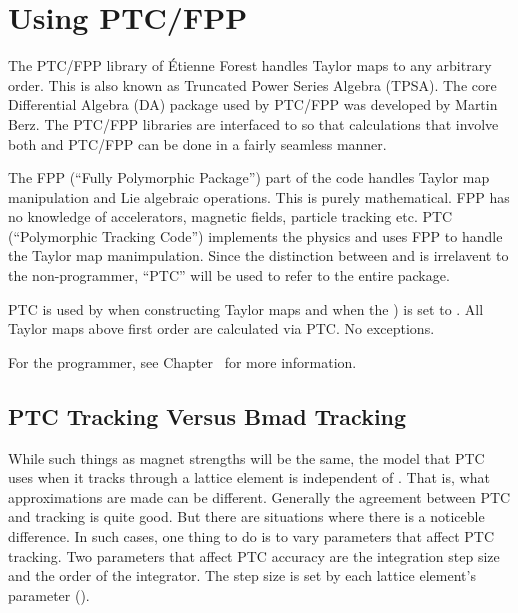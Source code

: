 \chapter{Using PTC/FPP}
\label{c:ptc.use}


The PTC/FPP library of \'Etienne Forest handles Taylor maps to any arbitrary order. This is also
known as Truncated Power Series Algebra (TPSA). The core Differential Algebra (DA) package used by
PTC/FPP was developed by Martin Berz\cite{b:berz}. The PTC/FPP libraries are interfaced to \bmad so
that calculations that involve both \bmad and PTC/FPP can be done in a fairly seamless manner.

The FPP (``Fully Polymorphic Package'') part of the code handles Taylor map manipulation
and Lie algebraic operations. This is purely mathematical. FPP has no knowledge of accelerators,
magnetic fields, particle tracking etc. PTC (``Polymorphic Tracking Code'') implements the physics
and uses FPP to handle the Taylor map manimpulation. Since the distinction between  and
 is irrelavent to the non-programmer, ``PTC'' will be used to refer to the entire package.

PTC is used by \bmad when constructing Taylor maps and when the 
) is set to . All Taylor maps above first order are calculated
via PTC. No exceptions.

For the programmer, see Chapter~ for more information.

\section{PTC Tracking Versus Bmad Tracking}
\label{s:ptc.bmad.track}

While such things as magnet strengths will be the same, the model that PTC uses when it tracks
through a lattice element is independent of \bmad. That is, what approximations are made can be
different. Generally the agreement between PTC and \bmad tracking is quite good. But there are
situations where there is a noticeble difference. In such cases, one thing to do is to vary
parameters that affect PTC tracking. Two parameters that affect PTC accuracy are the integration
step size and the order of the integrator. The step size is set by each lattice element's 
parameter (). 

